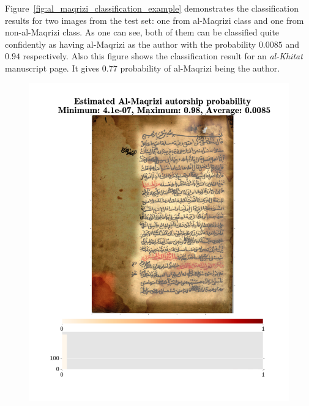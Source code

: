\documentclass[conference,a4paper,twocolumn]{IEEEtran}
\begin{document}
Figure~\ref{fig:al_maqrizi_classification_example} demonstrates the classification results for two images from the test set: one from al-Maqrizi class and one from non-al-Maqrizi class. As one can see, both of them can be classified quite confidently as having al-Maqrizi as the author with the probability $0.0085$ and $0.94$ respectively. Also this figure shows the classification result for an {\it al-Khitat} manuscript page. It gives $0.77$ probability of al-Maqrizi being the author.

\begin{figure}
\centering
\begin{minipage}{.48\linewidth}
	\centering
  \includegraphics[width=\linewidth]{figures/not_al_maqrizi_image_classification_example.png}
\end{minipage}
\hspace{.01\linewidth}
\begin{minipage}{.48\linewidth}
	\centering

\end{minipage}
\end{figure}
\end{document}
